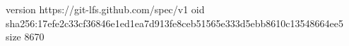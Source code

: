 version https://git-lfs.github.com/spec/v1
oid sha256:17efe2c33cf36846e1ed1ea7d913fe8ceb51565e333d5ebb8610c13548664ee5
size 8670
